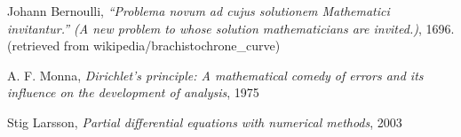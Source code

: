 \documentclass{article}
\begin{document}
\begin{thebibliography}{9}
Johann Bernoulli, \textit{``Problema novum ad cujus solutionem Mathematici invitantur.'' (A new problem to whose solution mathematicians are invited.)}, 1696.
(retrieved from wikipedia/brachistochrone\_curve)

A. F. Monna, \textit{Dirichlet's principle: A mathematical comedy of errors and its influence on the development of analysis}, 1975


Stig Larsson, \textit{Partial differential equations with numerical methods}, 2003


\end{thebibliography}
\end{document}
